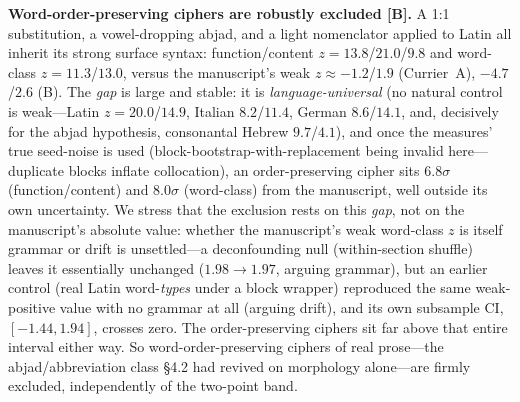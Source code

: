 \documentclass[11pt]{article}
\newcommand{\grade}[1]{{\small\textbf{[#1]}}}
\begin{document}
\textbf{Word-order-preserving ciphers are robustly excluded \grade{B}.} A 1:1 substitution,
a vowel-dropping abjad, and a light nomenclator applied to Latin all inherit its strong
surface syntax: function/content $z=13.8$/$21.0$/$9.8$ and word-class $z=11.3$/$13.0$, versus
the manuscript's weak $z\approx-1.2$/$1.9$ (Currier~A), $-4.7$/$2.6$ (B). The \emph{gap} is
large and stable: it is \emph{language-universal} (no natural control is weak---Latin
$z=20.0$/$14.9$, Italian $8.2$/$11.4$, German $8.6$/$14.1$, and, decisively for the abjad
hypothesis, consonantal Hebrew $9.7$/$4.1$), and once the measures' true seed-noise is used
(block-bootstrap-with-replacement being invalid here---duplicate blocks inflate collocation),
an order-preserving cipher sits $6.8\sigma$ (function/content) and $8.0\sigma$ (word-class)
from the manuscript, well outside its own uncertainty. We stress that the exclusion rests on
this \emph{gap}, not on the manuscript's absolute value: whether the manuscript's weak
word-class $z$ is itself grammar or drift is unsettled---a deconfounding null (within-section
shuffle) leaves it essentially unchanged ($1.98\!\to\!1.97$, arguing grammar), but an earlier
control (real Latin word-\emph{types} under a block wrapper) reproduced the same weak-positive
value with no grammar at all (arguing drift), and its own subsample CI, $[-1.44,1.94]$,
crosses zero. The order-preserving ciphers sit far above that entire interval either way. So
word-order-preserving
ciphers of real prose---the abjad/abbreviation class \S4.2 had revived on morphology
alone---are firmly excluded, independently of the two-point band.
\end{document}
